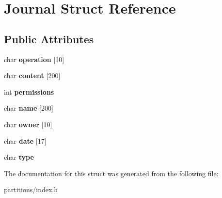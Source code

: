 \hypertarget{structJournal}{}\section{Journal Struct Reference}
\label{structJournal}
\subsection*{Public Attributes}
\begin{DoxyCompactItemize}
\item 
\mbox{\label{structJournal_a0c80567e2226e83ba4600ba1864de8bf}} 
char {\bfseries operation} \mbox{[}10\mbox{]}
\item 
\mbox{\label{structJournal_abcc17172cb9f9a050cb4af67c592d869}} 
char {\bfseries content} \mbox{[}200\mbox{]}
\item 
\mbox{\label{structJournal_aa888e32b3a06e48f51029ef7965794f0}} 
int {\bfseries permissions}
\item 
\mbox{\label{structJournal_af567a68495575d14ee9c37d8eca93019}} 
char {\bfseries name} \mbox{[}200\mbox{]}
\item 
\mbox{\label{structJournal_a754c3b3c833b9ea2dc797f6ed7a5d8c8}} 
char {\bfseries owner} \mbox{[}10\mbox{]}
\item 
\mbox{\label{structJournal_abd46b33cecbdccf990c475af712fac82}} 
char {\bfseries date} \mbox{[}17\mbox{]}
\item 
\mbox{\label{structJournal_ae5d57aaa0d6e5dd4a60a4d359e449833}} 
char {\bfseries type}
\end{DoxyCompactItemize}


The documentation for this struct was generated from the following file\+:\begin{DoxyCompactItemize}
\item 
partitions/index.\+h\end{DoxyCompactItemize}
